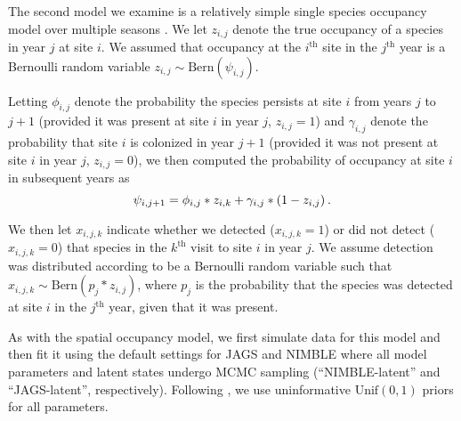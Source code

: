 \documentclass[12pt]{article}
\begin{document}
The second model we examine is a relatively simple single species
occupancy model over multiple seasons \citep{Royle2007}. We let
$z_{i,j}$ denote the true occupancy of a species in year $j$ at site
$i$.  We assumed that occupancy at the $i^{\mathrm{th}}$ site in the
$j^{\mathrm{th}}$ year is a Bernoulli random variable $z_{i,j} \sim
\mathrm{Bern}(\psi_{i,j})$.

Letting $\phi_{i,j}$ denote the probability the species persists at
site $i$ from years $j$ to $j+1$ (provided it was present at site $i$
in year $j$, $z_{i,j}=1$) and $\gamma_{i,j}$ denote the probability
that site $i$ is colonized in year $j+1$ (provided it was not present
at site $i$ in year $j$, $z_{i,j}=0$), we then computed the
probability of occupancy at site $i$ in subsequent years as
%
\begin{equation}
  \label{eq:mutliseason}
  \psi_{i,j+1} =
  \phi_{i,j} * z_{i,k} + \gamma_{i,j} * (1-z_{i,j})\hspace{0.2em}.
\end{equation}
%

We then let $x_{i,j,k}$ indicate whether we detected ($x_{i,j,k}=1$)
or did not detect ($x_{i,j,k}=0$) that species in the
$k^{\mathrm{th}}$ visit to site $i$ in year $j$. We assume detection
was distributed according to be a Bernoulli random variable such that
$x_{i,j,k} \sim \mathrm{Bern}(p_{j}*z_{i,j})$, where $p_{j}$ is the
probability that the species was detected at site $i$ in the
$j^{\mathrm{th}}$ year, given that it was present. 

As with the spatial occupancy model, we first simulate data for this
model and then fit it using the default settings for JAGS and NIMBLE
where all model parameters and latent states undergo MCMC sampling
(``NIMBLE-latent'' and ``JAGS-latent'', respectively). Following
\cite{Royle2007, kery-schaub-11}, we use uninformative
$\mathrm{Unif}(0,1)$ priors for all parameters.
\end{document}
